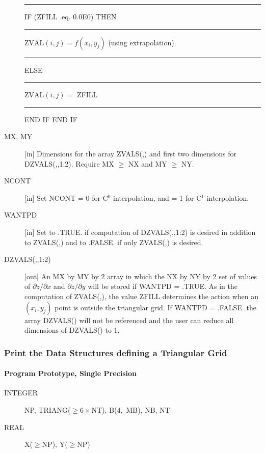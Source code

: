 \documentclass[twoside]{MATH77}
\begin{document}
\begin{description}
\rule{.2in}{0pt}IF (ZFILL .eq. 0.0E0) THEN\newline
\rule{.4in}{0pt}$\text{ZVAL}(i,j) = f(x_i, y_j)$ (using
extrapolation).\newline
\rule{.2in}{0pt}ELSE\newline
\rule{.4in}{0pt}$\text{ZVAL}(i,j) =$ ZFILL\newline
\rule{.2in}{0pt}END IF\newline
END IF
\item[MX, MY] [in] Dimensions for the array ZVALS(,) and first two
dimensions for DZVALS(,,1:2).  Require MX $\geq $ NX and MY $\geq $ NY.
\item[NCONT] [in] Set NCONT = 0 for C$^0$ interpolation,
and = 1 for C$^1$ interpolation.
\item[WANTPD] [in] Set to .TRUE. if computation of DZVALS(,,1:2) is
desired in addition to ZVALS(,) and to .FALSE. if only ZVALS(,) is
desired.
\item[DZVALS(,,1:2)] [out] An MX by MY by 2 array in which the NX by NY
by 2 set of values of $\partial z / \partial x$ and
$\partial z / \partial y$
will be stored if WANTPD = .TRUE.  As in the computation of ZVALS(,),
the value ZFILL determines the action when an $(x_i, y_j)$ point is
outside the triangular grid.\newline
If WANTPD = .FALSE. the array DZVALS() will not be referenced and the
user can reduce all dimensions of DZVALS() to 1.

\end{description}

\subsubsection{Print the Data Structures defining a Triangular Grid}

\paragraph{Program Prototype, Single Precision}

\begin{description}
\item[INTEGER] NP, TRIANG($\geq 6 \times$NT), B(4,~MB), NB, NT
\item[REAL] X($\geq$NP), Y($\geq$NP)
\end{description}
\begin{center}
\end{center}
\end{document}
